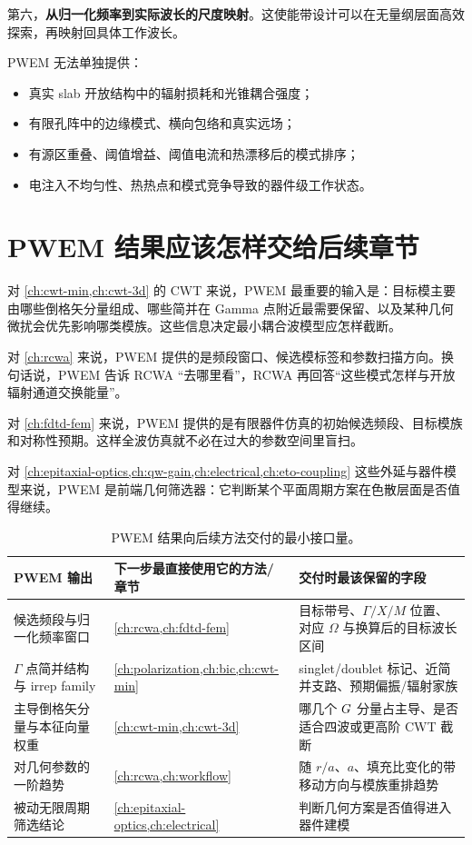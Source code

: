 第六，\textbf{从归一化频率到实际波长的尺度映射}。这使能带设计可以在无量纲层面高效探索，再映射回具体工作波长。

PWEM 无法单独提供：
\begin{itemize}
  \item 真实 slab 开放结构中的辐射损耗和光锥耦合强度；
  \item 有限孔阵中的边缘模式、横向包络和真实远场；
  \item 有源区重叠、阈值增益、阈值电流和热漂移后的模式排序；
  \item 电注入不均匀性、热热点和模式竞争导致的器件级工作状态。
\end{itemize}

\section{PWEM 结果应该怎样交给后续章节}
对 \cref{ch:cwt-min,ch:cwt-3d} 的 CWT 来说，PWEM 最重要的输入是：目标模主要由哪些倒格矢分量组成、哪些简并在 Gamma 点附近最需要保留、以及某种几何微扰会优先影响哪类模族。这些信息决定最小耦合波模型应怎样截断。

对 \cref{ch:rcwa} 来说，PWEM 提供的是频段窗口、候选模标签和参数扫描方向。换句话说，PWEM 告诉 RCWA “去哪里看”，RCWA 再回答“这些模式怎样与开放辐射通道交换能量”。

对 \cref{ch:fdtd-fem} 来说，PWEM 提供的是有限器件仿真的初始候选频段、目标模族和对称性预期。这样全波仿真就不必在过大的参数空间里盲扫。

对 \cref{ch:epitaxial-optics,ch:qw-gain,ch:electrical,ch:eto-coupling} 这些外延与器件模型来说，PWEM 是前端几何筛选器：它判断某个平面周期方案在色散层面是否值得继续。

\begin{table}[htbp]
  \centering
  \footnotesize
  \caption{PWEM 结果向后续方法交付的最小接口量。}
  \label{tab:pwem_handoff}
  \setlength{\tabcolsep}{4pt}
  \begin{tabularx}{\textwidth}{@{}p{3.0cm}p{4.0cm}Y@{}}
    \toprule
    PWEM 输出 & 下一步最直接使用它的方法/章节 & 交付时最该保留的字段 \\
    \midrule
    候选频段与归一化频率窗口 & \cref{ch:rcwa,ch:fdtd-fem} & 目标带号、$\Gamma/X/M$ 位置、对应 $\Omega$ 与换算后的目标波长区间 \\
    $\Gamma$ 点简并结构与 irrep family & \cref{ch:polarization,ch:bic,ch:cwt-min} & singlet/doublet 标记、近简并支路、预期偏振/辐射家族 \\
    主导倒格矢分量与本征向量权重 & \cref{ch:cwt-min,ch:cwt-3d} & 哪几个 $G$ 分量占主导、是否适合四波或更高阶 CWT 截断 \\
    对几何参数的一阶趋势 & \cref{ch:rcwa,ch:workflow} & 随 $r/a$、$a$、填充比变化的带移动方向与模族重排趋势 \\
    被动无限周期筛选结论 & \cref{ch:epitaxial-optics,ch:electrical} & 判断几何方案是否值得进入器件建模 \\
    \bottomrule
  \end{tabularx}
\end{table}

